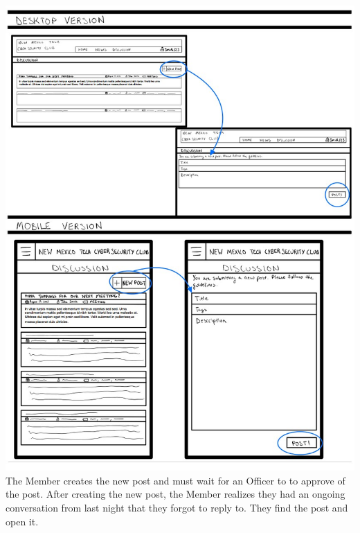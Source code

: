 \documentclass{article}
\begin{document}
\includegraphics[scale=0.60]{member_3.jpg} The Member creates the new post and must wait for an Officer to to approve of the post. After creating the new post, the Member realizes they had an ongoing conversation from last night that they forgot to reply to.  They find the post and open it.  
\par
\end{document}
